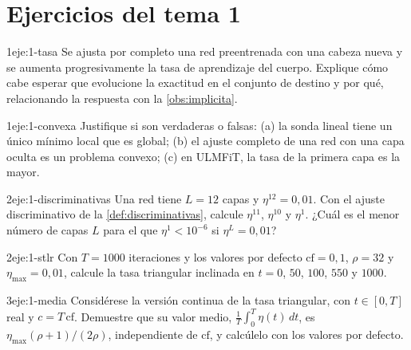 \section*{Ejercicios del tema 1}

\begin{ejercicio}{1}{eje:1-tasa}
Se ajusta por completo una red preentrenada con una cabeza nueva y se aumenta progresivamente la tasa de aprendizaje del cuerpo. Explique cómo cabe esperar que evolucione la exactitud en el conjunto de destino y por qué, relacionando la respuesta con la \cref{obs:implicita}.
\end{ejercicio}

\begin{ejercicio}{1}{eje:1-convexa}
Justifique si son verdaderas o falsas: (a) la sonda lineal tiene un único mínimo local que es global; (b) el ajuste completo de una red con una capa oculta es un problema convexo; (c) en ULMFiT, la tasa de la primera capa es la mayor.
\end{ejercicio}

\begin{ejercicio}{2}{eje:1-discriminativas}
Una red tiene $L=12$ capas y $\eta^{12}=0{,}01$. Con el ajuste discriminativo de la \cref{def:discriminativas}, calcule $\eta^{11}$, $\eta^{10}$ y $\eta^{1}$. ¿Cuál es el menor número de capas $L$ para el que $\eta^{1}<10^{-6}$ si $\eta^{L}=0{,}01$?
\end{ejercicio}

\begin{ejercicio}{2}{eje:1-stlr}
Con $T=1000$ iteraciones y los valores por defecto $\mathrm{cf}=0{,}1$, $\rho=32$ y $\eta_{\max}=0{,}01$, calcule la tasa triangular inclinada en $t=0$, $50$, $100$, $550$ y $1000$.
\end{ejercicio}

\begin{ejercicio}{3}{eje:1-media}
Considérese la versión continua de la tasa triangular, con $t\in[0,T]$ real y $c=T\,\mathrm{cf}$. Demuestre que su valor medio, $\frac{1}{T}\int_0^{T}\eta(t)\,dt$, es $\eta_{\max}(\rho+1)/(2\rho)$, independiente de $\mathrm{cf}$, y calcúlelo con los valores por defecto.
\end{ejercicio}

